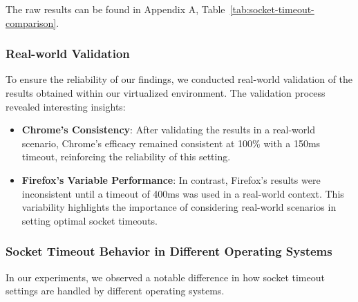 The raw results can be found in Appendix A, Table~\ref{tab:socket-timeout-comparison}.

\subsubsection{Real-world Validation}

To ensure the reliability of our findings, we conducted real-world validation of the results obtained within our virtualized environment. The validation process revealed interesting insights:

\begin{itemize}
    \item \textbf{Chrome's Consistency}: After validating the results in a real-world scenario, Chrome's efficacy remained consistent at 100\% with a 150ms timeout, reinforcing the reliability of this setting.
    
    \item \textbf{Firefox's Variable Performance}: In contrast, Firefox's results were inconsistent until a timeout of 400ms was used in a real-world context. This variability highlights the importance of considering real-world scenarios in setting optimal socket timeouts.
\end{itemize}


\subsubsection{Socket Timeout Behavior in Different Operating Systems}
\label{section:socket-timeout-comparison}

In our experiments, we observed a notable difference in how socket timeout settings are handled by different operating systems.

